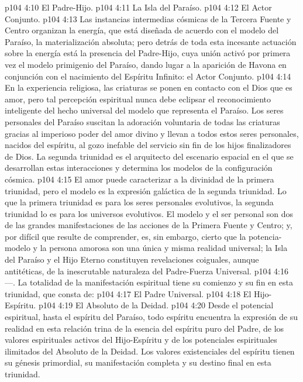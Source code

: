 \vs p104 4:10 El Padre\hyp{}Hijo.
\vs p104 4:11 La Isla del Paraíso.
\vs p104 4:12 El Actor Conjunto.
\vs p104 4:13 \pc Las instancias intermedias cósmicas de la Tercera Fuente y Centro organizan la energía, que está diseñada de acuerdo con el modelo del Paraíso, la materialización absoluta; pero detrás de toda esta incesante actuación sobre la energía está la presencia del Padre\hyp{}Hijo, cuya unión activó por primera vez el modelo primigenio del Paraíso, dando lugar a la aparición de Havona en conjunción con el nacimiento del Espíritu Infinito: el Actor Conjunto.
\vs p104 4:14 En la experiencia religiosa, las criaturas se ponen en contacto con el Dios que es amor, pero tal percepción espiritual nunca debe eclipsar el reconocimiento inteligente del hecho universal del modelo que representa el Paraíso. Los seres personales del Paraíso suscitan la adoración voluntaria de todas las criaturas gracias al imperioso poder del amor divino y llevan a todos estos seres personales, nacidos del espíritu, al gozo inefable del servicio sin fin de los hijos finalizadores de Dios. La segunda triunidad es el arquitecto del escenario espacial en el que se desarrollan estas interacciones y determina los modelos de la configuración cósmica.
\vs p104 4:15 El amor puede caracterizar a la divinidad de la primera triunidad, pero el modelo es la expresión galáctica de la segunda triunidad. Lo que la primera triunidad es para los seres personales evolutivos, la segunda triunidad lo es para los universos evolutivos. El modelo y el ser personal son dos de las grandes manifestaciones de las acciones de la Primera Fuente y Centro; y, por difícil que resulte de comprender, es, sin embargo, cierto que la potencia\hyp{}modelo y la persona amorosa son una única y misma realidad universal; la Isla del Paraíso y el Hijo Eterno constituyen revelaciones coiguales, aunque antitéticas, de la inescrutable naturaleza del Padre\hyp{}Fuerza Universal.
\vs p104 4:16 \pc {}---. La totalidad de la manifestación espiritual tiene su comienzo y su fin en esta triunidad, que consta de:
\vs p104 4:17 El Padre Universal.
\vs p104 4:18 El Hijo\hyp{}Espíritu.
\vs p104 4:19 El Absoluto de la Deidad.
\vs p104 4:20 \pc Desde el potencial espiritual, hasta el espíritu del Paraíso, todo espíritu encuentra la expresión de su realidad en esta relación trina de la esencia del espíritu puro del Padre, de los valores espirituales activos del Hijo\hyp{}Espíritu y de los potenciales espirituales ilimitados del Absoluto de la Deidad. Los valores existenciales del espíritu tienen su génesis primordial, su manifestación completa y su destino final en esta triunidad.
